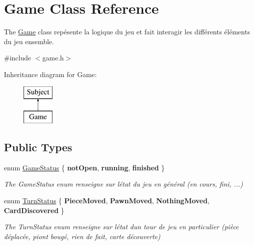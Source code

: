 \hypertarget{class_game}{}\section{Game Class Reference}
\label{class_game}


The \mbox{\hyperlink{class_game}{Game}} class repésente la logique du jeu et fait interagir les différents éléments du jeu ensemble.  




{\ttfamily \#include $<$game.\+h$>$}

Inheritance diagram for Game\+:\begin{figure}[H]
\begin{center}
\leavevmode
\includegraphics[height=2.000000cm]{class_game}
\end{center}
\end{figure}
\subsection*{Public Types}
\begin{DoxyCompactItemize}
\item 
\mbox{\label{class_game_ad7fdf24774752f47b6a14827e8bbc073}} 
enum \mbox{\hyperlink{class_game_ad7fdf24774752f47b6a14827e8bbc073}{Game\+Status}} \{ {\bfseries not\+Open}, 
{\bfseries running}, 
{\bfseries finished}
 \}
\begin{DoxyCompactList}\small\item\em The Game\+Status enum renseigne sur l\textquotesingle{}état du jeu en général (en cours, fini, ...) \end{DoxyCompactList}\item 
\mbox{\label{class_game_ad84f6c74c0b4b323fe4b13b7ad31f696}} 
enum \mbox{\hyperlink{class_game_ad84f6c74c0b4b323fe4b13b7ad31f696}{Turn\+Status}} \{ {\bfseries Piece\+Moved}, 
{\bfseries Pawn\+Moved}, 
{\bfseries Nothing\+Moved}, 
{\bfseries Card\+Discovered}
 \}
\begin{DoxyCompactList}\small\item\em The Turn\+Status enum renseigne sur l\textquotesingle{}état d\textquotesingle{}un tour de jeu en particulier (pièce déplacée, piont bougé, rien de fait, carte découverte) \end{DoxyCompactList}\end{DoxyCompactItemize}
